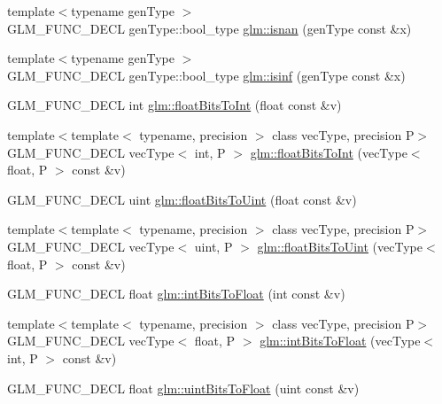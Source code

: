 \begin{DoxyCompactItemize}
\item 
{\footnotesize template$<$typename gen\+Type $>$ }\\G\+L\+M\+\_\+\+F\+U\+N\+C\+\_\+\+D\+E\+CL gen\+Type\+::bool\+\_\+type \hyperlink{group__core__func__common_ga8a9dec5200888766fbcb51b6a5898728}{glm\+::isnan} (gen\+Type const \&x)
\item 
{\footnotesize template$<$typename gen\+Type $>$ }\\G\+L\+M\+\_\+\+F\+U\+N\+C\+\_\+\+D\+E\+CL gen\+Type\+::bool\+\_\+type \hyperlink{group__core__func__common_ga9fce6a337c7e8ad089b9dc17c70cb873}{glm\+::isinf} (gen\+Type const \&x)
\item 
G\+L\+M\+\_\+\+F\+U\+N\+C\+\_\+\+D\+E\+CL int \hyperlink{group__core__func__common_gadc6a536a7bef046c3293d2ccad6d9ca2}{glm\+::float\+Bits\+To\+Int} (float const \&v)
\item 
{\footnotesize template$<$template$<$ typename, precision $>$ class vec\+Type, precision P$>$ }\\G\+L\+M\+\_\+\+F\+U\+N\+C\+\_\+\+D\+E\+CL vec\+Type$<$ int, P $>$ \hyperlink{group__core__func__common_gac4a0710238ae54c67931dd29a0b0f873}{glm\+::float\+Bits\+To\+Int} (vec\+Type$<$ float, P $>$ const \&v)
\item 
G\+L\+M\+\_\+\+F\+U\+N\+C\+\_\+\+D\+E\+CL uint \hyperlink{group__core__func__common_ga748b4d2819b48d28ca09dc8733488873}{glm\+::float\+Bits\+To\+Uint} (float const \&v)
\item 
{\footnotesize template$<$template$<$ typename, precision $>$ class vec\+Type, precision P$>$ }\\G\+L\+M\+\_\+\+F\+U\+N\+C\+\_\+\+D\+E\+CL vec\+Type$<$ uint, P $>$ \hyperlink{group__core__func__common_ga1804d4c443605d8a27be644aa461afe4}{glm\+::float\+Bits\+To\+Uint} (vec\+Type$<$ float, P $>$ const \&v)
\item 
G\+L\+M\+\_\+\+F\+U\+N\+C\+\_\+\+D\+E\+CL float \hyperlink{group__core__func__common_ga2650dc57b2148a6ffbce20944fb4d97a}{glm\+::int\+Bits\+To\+Float} (int const \&v)
\item 
{\footnotesize template$<$template$<$ typename, precision $>$ class vec\+Type, precision P$>$ }\\G\+L\+M\+\_\+\+F\+U\+N\+C\+\_\+\+D\+E\+CL vec\+Type$<$ float, P $>$ \hyperlink{group__core__func__common_gad21ab176dd0e6b59d923db5efca87f4e}{glm\+::int\+Bits\+To\+Float} (vec\+Type$<$ int, P $>$ const \&v)
\item 
G\+L\+M\+\_\+\+F\+U\+N\+C\+\_\+\+D\+E\+CL float \hyperlink{group__core__func__common_ga97464ca9ff4267de30ea408f700d4ca8}{glm\+::uint\+Bits\+To\+Float} (uint const \&v)

\end{DoxyCompactItemize}
